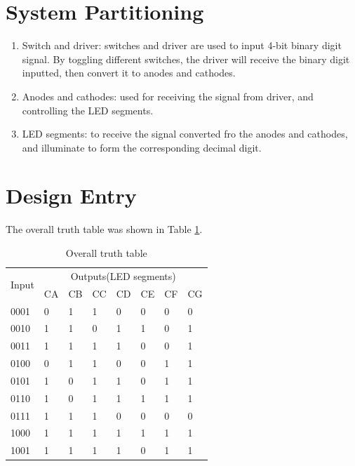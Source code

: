 \documentclass{article}
\begin{document}
\section{System Partitioning}
\begin{enumerate}
\item Switch and driver: switches and driver are used to input 4-bit binary digit signal. By toggling different switches, the driver will receive the binary digit inputted, then convert it to anodes and cathodes.
\item Anodes and cathodes: used for receiving the signal from driver, and controlling the LED segments.
\item LED segments: to receive the signal converted fro the anodes and cathodes, and illuminate to form the corresponding decimal digit.
\end{enumerate}

\section{Design Entry}
The overall truth table was shown in Table \ref{truth-table}.

\begin{table}[!hbtp]
\centering
\begin{tabular}{|p{1cm}<{\centering}|p{1cm}<{\centering}|p{1cm}<{\centering}|p{1cm}<{\centering}|p{1cm}<{\centering}|p{1cm}<{\centering}|p{1cm}<{\centering}|p{1cm}<{\centering}|}
\hline
\multirow{2}{*}{Input} & \multicolumn{7}{c|}{ Outputs(LED segments) }\\\cline{2-8}
& CA & CB & CC & CD & CE & CF & CG \\\hline
0001 & 0 & 1 & 1 & 0 & 0 & 0 & 0 \\\hline
0010 & 1 & 1 & 0 & 1 & 1 & 0 & 1 \\\hline
0011 & 1 & 1 & 1 & 1 & 0 & 0 & 1 \\\hline
0100 & 0 & 1 & 1 & 0 & 0 & 1 & 1 \\\hline
0101 & 1 & 0 & 1 & 1 & 0 & 1 & 1 \\\hline
0110 & 1 & 0 & 1 & 1 & 1 & 1 & 1 \\\hline
0111 & 1 & 1 & 1 & 0 & 0 & 0 & 0 \\\hline
1000 & 1 & 1 & 1 & 1 & 1 & 1 & 1 \\\hline
1001 & 1 & 1 & 1 & 1 & 0 & 1 & 1 \\\hline
\end{tabular}
\caption{Overall truth table}
\label{truth-table}
\end{table}
\end{document}
